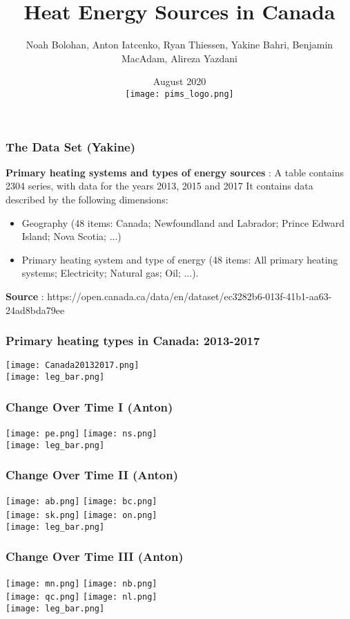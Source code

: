 \documentclass{beamer}
\title{Heat Energy Sources in Canada}
\author{Noah Bolohan, Anton Iatcenko, Ryan Thiessen, Yakine Bahri, Benjamin MacAdam, Alireza Yazdani}
\institute{Math\textsuperscript{Industry}}
\date{August 2020  \\ \vspace{30pt} \texttt{[image: pims\_logo.png]} }
\begin{document}
\frame{\titlepage}

\begin{frame}
\frametitle{The Data Set (Yakine)}
\textbf{Primary heating systems and types of energy sources} : A table contains 2304 series, with data for the years 2013, 2015 and 2017
It contains data described by the following dimensions:
\begin{itemize}
\item Geography (48 items: Canada; Newfoundland and Labrador; Prince Edward Island; Nova Scotia; ...)
\item Primary heating system and type of energy (48 items: All primary heating systems; Electricity; Natural gas; Oil; ...).
\end{itemize}
\textbf{Source} : https://open.canada.ca/data/en/dataset/ec3282b6-013f-41b1-aa63-24ad8bda79ee
\end{frame}


\begin{frame}
\frametitle{Primary heating types in Canada: 2013-2017}
\texttt{[image: Canada20132017.png]}\\
\texttt{[image: leg\_bar.png]}
\end{frame}



\begin{frame}
\frametitle{Change Over Time I (Anton)}
\texttt{[image: pe.png]}%
\texttt{[image: ns.png]}\\
\texttt{[image: leg\_bar.png]}
\end{frame}


\begin{frame}
\frametitle{Change Over Time II (Anton)}
\texttt{[image: ab.png]}%
\texttt{[image: bc.png]}\\
\texttt{[image: sk.png]}%
\texttt{[image: on.png]}\\
\texttt{[image: leg\_bar.png]}
\end{frame}


\begin{frame}
\frametitle{Change Over Time III (Anton)}
\texttt{[image: mn.png]}%
\texttt{[image: nb.png]}\\
\texttt{[image: qc.png]}%
\texttt{[image: nl.png]}\\
\texttt{[image: leg\_bar.png]}
\end{frame}
\end{document}
